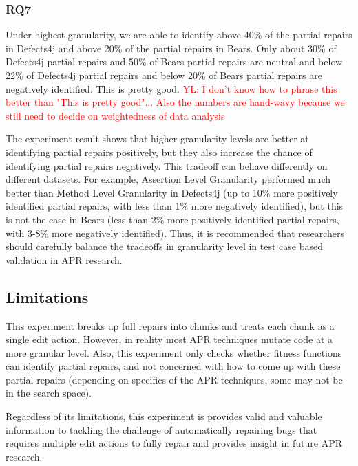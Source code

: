 \documentclass[sigconf, timestamp-false, anonymous=true]{acmart}
\newcommand\todo[1]{\textcolor{red}{#1}}
\begin{document}
\subsubsection{RQ7}

Under highest granularity, we are able to identify above 40\% of the partial repairs in Defects4j
and above 20\% of the partial repairs in Bears. Only about 30\% of Defects4j partial repairs and 50\%
of Bears partial repairs are neutral and below 22\% of Defects4j partial repairs and below 20\% 
of Bears partial repairs are negatively identified. This is pretty good. \todo{YL: I don't know how to phrase this better than
"This is pretty good"... Also the numbers are hand-wavy because we still need to decide on weightedness of data analysis}

The experiment result shows that higher granularity levels are better at identifying partial repairs positively, 
but they also increase the chance of identifying partial repairs negatively.
This tradeoff can behave differently on different datasets. For example,
Assertion Level Granularity performed much better than Method Level Granularity
in Defects4j (up to 10\% more positively identified partial repairs, with less than
1\% more negatively identified), but this is not the case in Bears (less than 2\%
more positively identified partial repairs, with 3-8\% more negatively identified).
Thus, it is recommended that researchers should 
carefully balance the tradeoffs in granularity level in test case based validation
in APR research.


\subsection{Limitations}

This experiment breaks up full repairs into chunks and treats each chunk as a 
single edit action. However, in reality most APR techniques mutate code at 
a more granular level.
Also, this experiment only checks whether fitness functions 
can identify partial repairs, and not concerned with how to come up with these 
partial repairs (depending on specifics of the APR 
techniques, some may not be in the search space).

Regardless of its limitations, this experiment is provides valid and valuable 
information to tackling the challenge of automatically repairing bugs that 
requires multiple edit actions to fully repair 
and provides insight in future APR research.
\end{document}
